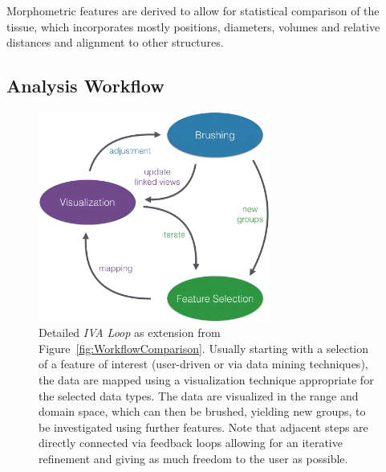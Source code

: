 \documentclass[journal]{style/vgtc} 			          %
\begin{document}
Morphometric features are derived to allow for statistical comparison of the tissue, which incorporates mostly positions, diameters, volumes and relative distances and alignment to other structures.
% 
\subsection{Analysis Workflow}
\begin{figure}[htb]
 \centering
 \includegraphics[width=3.0in]{figures/InteractionLoop}
 \caption{Detailed \emph{IVA Loop} as extension from Figure~\ref{fig:WorkflowComparison}.
 Usually starting with a selection of a feature of interest (user-driven or via data mining techniques), the data are mapped using a visualization technique appropriate for the selected data types.
 The data are visualized in the range and domain space, which can then be brushed, yielding new groups, to be investigated using further features.
 Note that adjacent steps are directly connected via feedback loops allowing for an iterative refinement and giving as much freedom to the user as possible.}
 \label{fig:InteractionLoop}
\end{figure}
\end{document}
